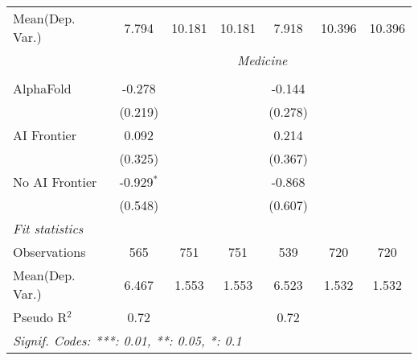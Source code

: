 \begin{tabular}{lcccccc}
Mean(Dep. Var.) & 7.794 & 10.181 & 10.181 & 7.918 & 10.396 & 10.396 \\
 & \multicolumn{6}{c}{\textit{Medicine}} \\ \\
   AlphaFold      & -0.278       &     &     & -0.144  &     &   \\   
                  & (0.219)      &     &     & (0.278) &     &   \\   
   AI Frontier    & 0.092        &     &     & 0.214   &     &   \\   
                  & (0.325)      &     &     & (0.367) &     &   \\   
   No AI Frontier & -0.929$^{*}$ &     &     & -0.868  &     &   \\   
                  & (0.548)      &     &     & (0.607) &     &   \\   
   \midrule
   \emph{Fit statistics}\\
   Observations   & 565          & 751 & 751 & 539     & 720 & 720\\  
Mean(Dep. Var.) & 6.467 & 1.553 & 1.553 & 6.523 & 1.532 & 1.532 \\
   Pseudo R$^2$   & 0.72         &     &     & 0.72    &     & \\  
   \midrule \midrule
   \multicolumn{7}{l}{\emph{Signif. Codes: ***: 0.01, **: 0.05, *: 0.1}}\\
\end{tabular}
\par\endgroup
